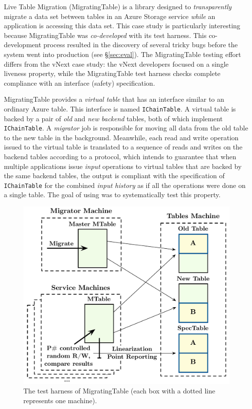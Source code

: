 Live Table Migration (MigratingTable) is a library designed to \emph{transparently} migrate a data set between tables in an Azure Storage service \emph{while} an application is accessing this data set. This case study is particularly interesting because MigratingTable was \emph{co-developed} with its \psharp test harness. This co-development process resulted in the discovery of several tricky bugs before the system went into production (see \S\ref{sec:eval}). The MigratingTable testing effort differs from the vNext case study: the vNext developers focused on a single liveness property, while the MigratingTable test harness checks complete compliance with an interface (safety) specification.

MigratingTable provides a \emph{virtual table} that has an interface similar to an ordinary Azure table. This interface is named \texttt{IChainTable}. A virtual table is backed by a pair of \emph{old} and \emph{new} \emph{backend} tables, both of which implement \texttt{IChainTable}. A \emph{migrator} job is responsible for moving all data from the old table to the new table in the background. Meanwhile, each read and write operation issued to the virtual table is translated to a sequence of reads and writes on the backend tables according to a protocol, which intends to guarantee that when multiple applications issue \emph{input} operations to virtual tables that are backed by the same backend tables, the output is compliant with the specification of \texttt{IChainTable} for the combined \emph{input history} as if all the operations were done on a single table. The goal of using \psharp was to systematically test this property.

\begin{figure}[t]
\centering
\includegraphics[width=\linewidth]{img/modeled_migration}
\caption{The \psharp test harness of MigratingTable (each box with a dotted line represents one \psharp machine).}
\label{fig:mockedmigration}
\end{figure}

